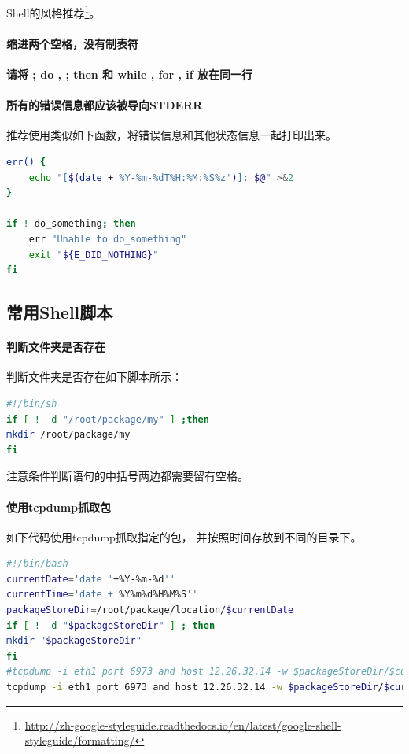 \documentclass{book}
\begin{document}
Shell的风格推荐\footnote{\url{http://zh-google-styleguide.readthedocs.io/en/latest/google-shell-styleguide/formatting/}}。

\paragraph{缩进两个空格，没有制表符}
\paragraph{请将 ; do , ; then 和 while , for , if 放在同一行}
\paragraph{所有的错误信息都应该被导向STDERR}
推荐使用类似如下函数，将错误信息和其他状态信息一起打印出来。

\begin{lstlisting}[language=Bash]
err() {
	echo "[$(date +'%Y-%m-%dT%H:%M:%S%z')]: $@" >&2
}

if ! do_something; then
	err "Unable to do_something"
	exit "${E_DID_NOTHING}"
fi
\end{lstlisting}

\subsection{常用Shell脚本}

\paragraph{判断文件夹是否存在}判断文件夹是否存在如下脚本所示：

\begin{lstlisting}[language=Bash]
#!/bin/sh
if [ ! -d "/root/package/my" ] ;then
mkdir /root/package/my
fi
\end{lstlisting}

注意条件判断语句的中括号两边都需要留有空格。

\paragraph{使用tcpdump抓取包}如下代码使用tcpdump抓取指定的包，
并按照时间存放到不同的目录下。

\begin{lstlisting}[language=Bash]
#!/bin/bash
currentDate='date '+%Y-%m-%d''
currentTime='date +'%Y%m%d%H%M%S''
packageStoreDir=/root/package/location/$currentDate
if [ ! -d "$packageStoreDir" ] ; then
mkdir "$packageStoreDir"
fi
#tcpdump -i eth1 port 6973 and host 12.26.32.14 -w $packageStoreDir/$currentTime.cap
tcpdump -i eth1 port 6973 and host 12.26.32.14 -w $packageStoreDir/$currentTime.cap
\end{lstlisting}
\end{document}
